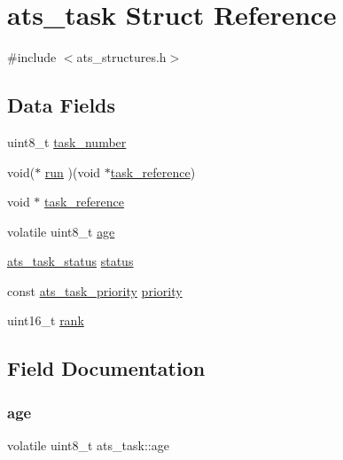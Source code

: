 \hypertarget{structats__task}{}\section{ats\+\_\+task Struct Reference}
\label{structats__task}


{\ttfamily \#include $<$ats\+\_\+structures.\+h$>$}

\subsection*{Data Fields}
\begin{DoxyCompactItemize}
\item 
uint8\+\_\+t \hyperlink{structats__task_af20709f28ea72921531abf5218726351}{task\+\_\+number}
\item 
void($\ast$ \hyperlink{structats__task_a1b324229e7846c3a5697b49e4c999fa2}{run} )(void $\ast$\hyperlink{structats__task_a058f0acf4bc87250302ff718710d5dbf}{task\+\_\+reference})
\item 
void $\ast$ \hyperlink{structats__task_a058f0acf4bc87250302ff718710d5dbf}{task\+\_\+reference}
\item 
volatile uint8\+\_\+t \hyperlink{structats__task_ad64e472453160827680e81e6fc3b72bc}{age}
\item 
\hyperlink{ats__structures_8h_a4ed54211a8f5f8fa819d62ee43a54593}{ats\+\_\+task\+\_\+status} \hyperlink{structats__task_a3e13df7d62534617863b74120208cc35}{status}
\item 
const \hyperlink{ats__structures_8h_aecd566edd2fb3dd9c32dfb8ca7f34147}{ats\+\_\+task\+\_\+priority} \hyperlink{structats__task_a61405b3fc14d07b23f87ed165a9dc7b9}{priority}
\item 
uint16\+\_\+t \hyperlink{structats__task_a9f5c1f88ad47cd9c31caaea67f5012a0}{rank}
\end{DoxyCompactItemize}


\subsection{Field Documentation}
\mbox{\label{structats__task_ad64e472453160827680e81e6fc3b72bc}} 
\subsubsection{\texorpdfstring{age}{age}}
{\footnotesize\ttfamily volatile uint8\+\_\+t ats\+\_\+task\+::age}

